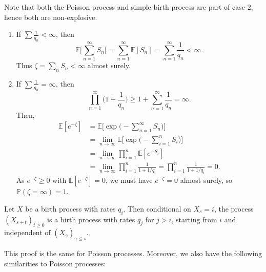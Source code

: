 \documentclass[12pt]{article}
\begin{document}
Note that both the Poisson process and simple birth process are part of case 2, hence both are non-explosive.

\begin{proofbox}
	\begin{enumerate}[1.]
		\item If $\sum \frac{1}{q_n} < \infty$, then
			\[
			\mathbb{E}\biggl[ \sum_{n = 1}^{\infty} S_n \biggr] = \sum_{n = 1}^{\infty} \mathbb{E}[S_n] = \sum_{n = 1}^{\infty} \frac{1}{q_n} < \infty
			.\]
			Thus $\zeta = \sum_n S_n < \infty$ almost surely.
		\item If $\sum \frac{1}{q_n} = \infty$, then 
			\[
			\prod_{n = 1}^{\infty} \biggl( 1 + \frac{1}{q_n} \biggr) \geq 1 + \sum_{n = 1}^{\infty} \frac{1}{q_n} = \infty
			.\]
			Then,
			\begin{align*}
				\mathbb{E}[e^{-\zeta}] &= \mathbb{E}\biggl[ \exp \biggl( - \sum_{n = 1}^{\infty} S_n \biggr) \biggr] \\
						       &= \lim_{n \to \infty} \mathbb{E}\biggl[ \exp \biggl( -\sum_{i = 1}^{n} S_i \biggr) \biggr] \\
						       &= \lim_{n \to \infty} \prod_{i = 1}^{n} \mathbb{E}[e^{-S_i}] \\
						       &= \lim_{n \to \infty} \prod_{i = 1}^{n} \frac{1}{1 + 1/q_i} = \prod_{i = 1}^{n} \frac{1}{1 + 1/q_i} = 0.
			\end{align*}
			As $e^{-\zeta} \geq 0$ with $\mathbb{E}[e^{-\zeta}] = 0$, we must have $e^{-\zeta} = 0$ almost surely, so $\mathbb{P}(\zeta = \infty) = 1$.
	\end{enumerate}
\end{proofbox}

\begin{theorem}
	Let $X$ be a birth process with rates $q_i$. Then conditional on $X_s = i$, the process $(X_{s+t})_{t \geq 0}$ is a birth process with rates $q_j$ for $j > i$, starting from $i$ and independent of $(X_\gamma)_{\gamma \leq s}$.
\end{theorem}

This proof is the same for Poisson processes. Moreover, we also have the following similarities to Poisson processes:
\end{document}
